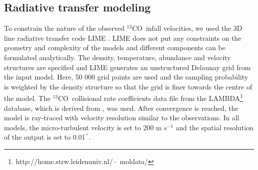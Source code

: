 \documentclass{aa}
\newcommand{\trettenco}{$^{13}$CO\xspace}
\newcommand{\asec}{$^{\prime \prime}$}
\begin{document}

\subsection{Radiative transfer modeling}
\label{sec:radiativetransfer}
To constrain the nature of the observed \trettenco\ infall velocities, we used the 3D line radiative transfer code LIME \citep[][v1.4.3]{Brinch:2010rm}. LIME does not put any constraints on the geometry and complexity of the models and different components can be formulated analytically. The density, temperature, abundance and velocity structures are specified and LIME generates an unstructured Delaunay grid from the input model. Here, 50 000 grid points are used and the sampling probability is weighted by the density structure so that the grid is finer towards the centre of the model. The \trettenco\ collisional rate coefficients data file from the LAMBDA\footnote{http://home.strw.leidenuniv.nl/~$\tilde{ }$~moldata/} database, which is derived from \citet{Yang:2010vn}, was used. After convergence is reached, the model is ray-traced with velocity resolution similar to the observations. In all models, the micro-turbulent velocity is set to 200 m s$^{-1}$ and the spatial resolution of the output is set to 0.01\asec.
\end{document}
